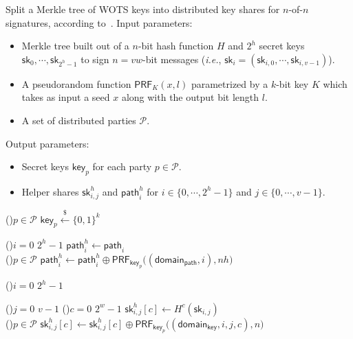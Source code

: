 \begin{myalgorithm}{Split a Merkle tree of WOTS keys into distributed key shares for $n$-of-$n$ signatures, according to~\cite{cryptoeprint:2022/241}.}
Input parameters:
\begin{itemize}
\itemsep-.5em
\item Merkle tree built out of a $n$-bit hash function $H$ and $2^h$ \WOTS secret keys $\mathsf{sk}_0,\cdots,\mathsf{sk}_{2^h-1}$ to sign $n=vw$-bit messages (\textit{i.e.}, $\mathsf{sk}_i = (\mathsf{sk}_{i,0}, \cdots, \mathsf{sk}_{i,v-1})$).
\item A pseudorandom function $\mathsf{PRF}_K(x,l)$ parametrized by a $k$-bit key $K$ which takes as input a seed $x$ along with the output bit length $l$.
\item A set of distributed parties $\mathcal{P}$.
\end{itemize}

Output parameters:
\vspace{-.75em}
\begin{itemize}
\itemsep-.5em
\item Secret keys $\mathsf{key}_p$ for each party $p \in \mathcal{P}$.
\item Helper shares $\mathsf{sk}^h_{i,j}$ and $\mathsf{path}^h_{i}$ for $i \in \{0,\cdots,2^h-1\}$ and $j \in \{0, \cdots, v-1\}$.
\end{itemize}

\ForEach(){$p \in \mathcal{P}$} {
	$\mathsf{key}_p \xleftarrow[]{\$} \{0,1\}^k $ 
}

\For(){$i=0$ \KwTo $2^h-1$} {
	$\mathsf{path}^h_i \leftarrow \mathsf{path}_i$\\
	\ForEach(){$p \in \mathcal{P}$} {
		$\mathsf{path}^h_i \leftarrow \mathsf{path}^h_i \oplus \mathsf{PRF}_{\mathsf{key}_p}\big((\mathsf{domain_{path}}, i), nh\big)$\\
	}
}
	
\For(){$i=0$ \KwTo $2^h-1$} {
	\For(){$j=0$ \KwTo $v-1$} {
		\For(){$c=0$ \KwTo $2^w-1$} {
		$\mathsf{sk}^h_{i,j}[c] \leftarrow H^c(\mathsf{sk}_{i,j})$ \\
		\ForEach(){$p \in \mathcal{P}$} {
			$\mathsf{sk}^h_{i,j}[c] \leftarrow \mathsf{sk}^h_{i,j}[c] \oplus \mathsf{PRF}_{\mathsf{key}_p}\big((\mathsf{domain_{key}}, i, j, c), n\big)$\\
			}
		}
	}

}
\label{alg:bool_split_n}
\end{myalgorithm}

